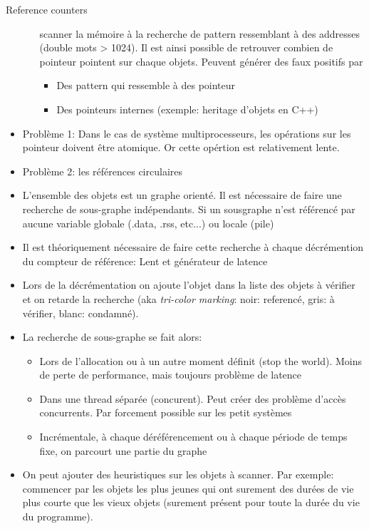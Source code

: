 \begin{frame}[fragile=singleslide]{Reference counters}
\begin{itemize}
\begin{itemize}
      scanner la mémoire  à la recherche de pattern  ressemblant à des
      addresses  (double  mots  >  1024).  Il est  ainsi  possible  de
      retrouver combien de pointeur pointent sur chaque objets. Peuvent générer des faux positifs par 
      \begin{itemize} 
      \item Des pattern qui ressemble à des pointeur
      \item Des pointeurs internes (exemple: heritage d'objets en C++)
      \end{itemize} 
    \end{itemize}
  \item  Problème 1:  Dans  le cas  de  système multiprocesseurs,  les
    opérations  sur  les  pointeur  doivent être  atomique.  Or  cette
    opértion est relativement lente.
  \item Problème 2: les références circulaires
  \item L'ensemble des objets est un graphe orienté. Il est nécessaire
    de  faire  une  recherche   de  sous-graphe  indépendants.  Si  un
    sousgraphe  n'est référencé  par aucune  variable  globale (.data,
    .rss, etc...) ou locale (pile)
  \item  Il est théoriquement  nécessaire de  faire cette  recherche à
    chaque décrémention  du compteur de référence:  Lent et générateur
    de latence
   \item Lors de la décrémentation on ajoute l'objet dans la liste des
     objets à vérifier et on retarde la recherche (aka \emph{tri-color
       marking}: noir: referencé, gris: à vérifier, blanc: condamné).
     \item La recherche de sous-graphe se fait alors:
       \begin{itemize} 
       \item Lors de  l'allocation ou à un autre  moment définit (stop
         the  world). Moins  de  perte de  performance, mais  toujours
         problème de latence
       \item  Dans  une thread  séparée  (concurent).  Peut créer  des
         problème d'accès concurrents.  Par forcement possible sur les
         petit systèmes
       \item  Incrémentale,  à  chaque  déréférencement  ou  à  chaque
         période de temps fixe, on parcourt une partie du graphe
  \end{itemize}
\item On peut  ajouter des heuristiques sur les  objets à scanner. Par
  exemple: commencer par  les objets les plus jeunes  qui ont surement
  des durées de vie plus courte que les vieux objets (surement présent
  pour toute la durée du vie du programme).
\end{itemize}
\end{frame} 


